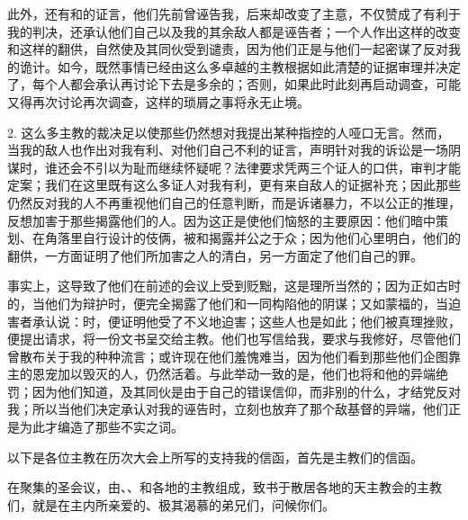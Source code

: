 此外，还有和的证言，他们先前曾诬告我，后来却改变了主意，不仅赞成了有利于我的判决，还承认他们自己以及我的其余敌人都是诬告者；一个人作出这样的改变和这样的翻供，自然使及其同伙受到谴责，因为他们正是与他们一起密谋了反对我的诡计。如今，既然事情已经由这么多卓越的主教根据如此清楚的证据审理并决定了，每个人都会承认再讨论下去是多余的；否则，如果此时此刻再启动调查，可能又得再次讨论再次调查，这样的琐屑之事将永无止境。\par

2. 这么多主教的裁决足以使那些仍然想对我提出某种指控的人哑口无言。然而，当我的敌人也作出对我有利、对他们自己不利的证言，声明针对我的诉讼是一场阴谋时，谁还会不引以为耻而继续怀疑呢？法律要求凭两三个证人的口供，审判才能定案；我们在这里既有这么多证人对我有利，更有来自敌人的证据补充；因此那些仍然反对我的人不再重视他们自己的任意判断，而是诉诸暴力，不以公正的推理，反想加害于那些揭露他们的人。因为这正是使他们恼怒的主要原因：他们暗中策划、在角落里自行设计的伎俩，被和揭露并公之于众；因为他们心里明白，他们的翻供，一方面证明了他们所加害之人的清白，另一方面定了他们自己的罪。\par

事实上，这导致了他们在前述的会议上受到贬黜，这是理所当然的；因为正如古时的，当他们为辩护时，便完全揭露了他们和一同构陷他的阴谋；又如蒙福的，当迫害者承认说：时，便证明他受了不义地迫害；这些人也是如此；他们被真理挫败，便提出请求，将一份文书呈交给主教。他们也写信给我，要求与我修好，尽管他们曾散布关于我的种种流言；或许现在他们羞愧难当，因为他们看到那些他们企图靠主的恩宠加以毁灭的人，仍然活着。与此举动一致的是，他们也将和他的异端绝罚；因为他们知道，及其同伙是由于自己的错误信仰，而非别的什么，才结党反对我；所以当他们决定承认对我的诬告时，立刻也放弃了那个敌基督的异端，他们正是为此才编造了那些不实之词。\par

以下是各位主教在历次大会上所写的支持我的信函，首先是主教们的信函。\par

\par

在聚集的圣会议，由、、和各地的主教组成，致书于散居各地的天主教会的主教们，就是在主内所亲爱的、极其渴慕的弟兄们，问候你们。\par

